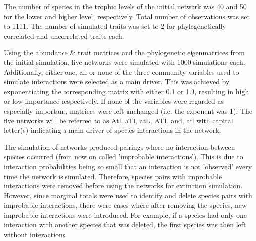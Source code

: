 \documentclass[12pt,a4paper]{article}
\begin{document}
	
	The number of species in the trophic levels of the initial network was 40 and 50 for the lower and higher level, respectively. Total number of observations was set to 1111. The number of simulated traits was set to 2 for phylogenetically correlated and uncorrelated traits each.
	

	Using the abundance \& trait matrices and the phylogenetic eigenmatrices from the initial simulation, five networks were simulated with 1000 simulations each. Additionally, either one, all or none of the three community variables used to simulate interactions were selected as a main driver. This was achieved by exponentiating the corresponding matrix with either 0.1 or 1.9, resulting in high or low importance respectively. If none of the variables were regarded as especially important, matrices were left unchanged (i.e. the exponent was 1). The five networks will be referred to as Atl, aTl, atL, ATL and, atl with capital letter(s) indicating a main driver of species interactions in the network.
	
	 The simulation of networks produced pairings where no interaction between species occurred (from now on called 'improbable interactions'). This is due to interaction probabilities being so small that an interaction is not 'observed' every time the network is simulated. Therefore, species pairs with improbable interactions were removed before using the networks for extinction simulation. However, since marginal totals were used to identify and delete species pairs with improbable interactions, there were cases where after removing the species, new improbable interactions were introduced. For example, if a species had only one interaction with another species that was deleted, the first species was then left without interactions.
	 
	 
\end{document}

